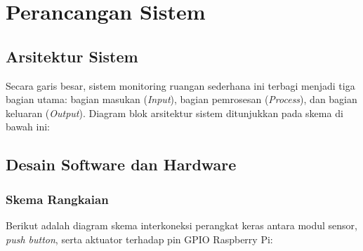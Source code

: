 \documentclass[12pt, a4paper]{article}
\begin{document}
\section{Perancangan Sistem}
\subsection{Arsitektur Sistem}
Secara garis besar, sistem monitoring ruangan sederhana ini terbagi menjadi tiga bagian utama: bagian masukan (\textit{Input}),
 bagian pemrosesan (\textit{Process}), dan bagian keluaran (\textit{Output}). Diagram blok arsitektur sistem ditunjukkan pada 
 skema di bawah ini:

\vspace{0.3cm}
\noindent{}
\vspace{0.3cm}

\subsection{Desain Software dan Hardware}
\subsubsection{Skema Rangkaian}
Berikut adalah diagram skema interkoneksi perangkat keras antara modul sensor, \textit{push button}, serta aktuator terhadap pin GPIO Raspberry Pi:
\end{document}
